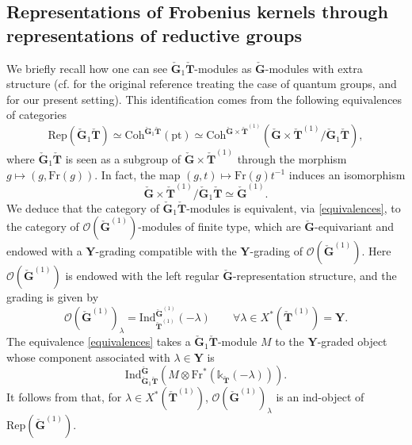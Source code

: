 \documentclass[11pt]{amsart}
\theoremstyle{plain}
\theoremstyle{remark}
\numberwithin{equation}{section}
\begin{document}
	\subsection{Representations of Frobenius kernels through representations of reductive groups}\label{section Representations of Frobenius kernels}
	We briefly recall how one can see $\check{\mathbf{G}}_1\check{\mathbf{T}}$-modules as $\check{\mathbf{G}}$-modules with extra structure (cf. \cite{ARKHIPOV2003114} for the original reference treating the case of quantum groups, and \cite[§4.1]{achar2022geometric} for our present setting). This identification comes from the following equivalences of categories
	\begin{equation}\label{equivalences}
		\mathrm{Rep}(\check{\mathbf{G}}_1\check{\mathbf{T}})\simeq \mathrm{Coh}^{\check{\mathbf{G}}_1\check{\mathbf{T}}}(\mathrm{pt})\simeq \mathrm{Coh}^{\check{\mathbf{G}}\times\check{\mathbf{T}}^{(1)}}(\check{\mathbf{G}}\times\check{\mathbf{T}}^{(1)}/ \check{\mathbf{G}}_1\check{\mathbf{T}}),
	\end{equation}
	where $\check{\mathbf{G}}_1\check{\mathbf{T}}$ is seen as a subgroup of $\check{\mathbf{G}}\times\check{\mathbf{T}}^{(1)}$ through the morphism $g\mapsto (g,\mathrm{Fr}(g))$. In fact, the map $(g,t)\mapsto \mathrm{Fr}(g)t^{-1}$ induces an isomorphism
	$$\check{\mathbf{G}}\times\check{\mathbf{T}}^{(1)}/ \check{\mathbf{G}}_1\check{\mathbf{T}}\simeq \check{\mathbf{G}}^{(1)}.$$
	We deduce that the category of $\check{\mathbf{G}}_1\check{\mathbf{T}}$-modules is equivalent, via \eqref{equivalences}, to the category of $\mathcal{O}(\check{\mathbf{G}}^{(1)})$-modules of finite type, which are  $\check{\mathbf{G}}$-equivariant and endowed with a $\mathbf{Y}$-grading compatible with the $\mathbf{Y}$-grading of $\mathcal{O}(\check{\mathbf{G}}^{(1)})$. Here $\mathcal{O}(\check{\mathbf{G}}^{(1)})$ is endowed with the left regular $\check{\mathbf{G}}$-representation structure, and the grading is given by
	$$\mathcal{O}(\check{\mathbf{G}}^{(1)})_\lambda=\mathrm{Ind}_{\check{\mathbf{T}}^{(1)}}^{\check{\mathbf{G}}^{(1)}}(-\lambda)\qquad\forall \lambda\in X^*(\check{\mathbf{T}}^{(1)})=\mathbf{Y}. $$
 The equivalence \eqref{equivalences} takes a $\check{\mathbf{G}}_1\check{\mathbf{T}}$-module $M$ to the $\mathbf{Y}$-graded object whose component associated with $\lambda\in\mathbf{Y}$ is
 $$\mathrm{Ind}_{\check{\mathbf{G}}_1\check{\mathbf{T}}}^{\check{\mathbf{G}}}(M\otimes\mathrm{Fr}^*(\mathbb{k}_{\check{\mathbf{T}}}(-\lambda))). $$
It follows from \cite[Lemma 4.2]{achar2022geometric} that, for $\lambda\in X^*(\check{\mathbf{T}}^{(1)})$, $\mathcal{O}(\check{\mathbf{G}}^{(1)})_\lambda$ is an ind-object of $\mathrm{Rep}(\check{\mathbf{G}}^{(1)})$. 
\end{document}
